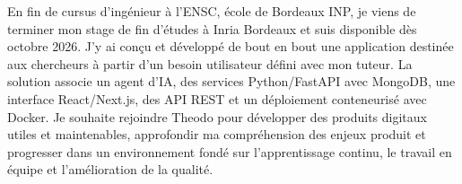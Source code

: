 
\begin{cvparagraph}
En fin de cursus d’ingénieur à l’ENSC, école de Bordeaux INP, je viens de terminer mon stage de fin d’études à Inria Bordeaux et suis disponible dès octobre 2026. J’y ai conçu et développé de bout en bout une application destinée aux chercheurs à partir d’un besoin utilisateur défini avec mon tuteur. La solution associe un agent d’IA, des services Python/FastAPI avec MongoDB, une interface React/Next.js, des API REST et un déploiement conteneurisé avec Docker. Je souhaite rejoindre Theodo pour développer des produits digitaux utiles et maintenables, approfondir ma compréhension des enjeux produit et progresser dans un environnement fondé sur l’apprentissage continu, le travail en équipe et l’amélioration de la qualité.
\end{cvparagraph}
